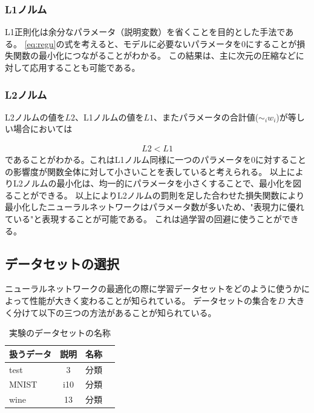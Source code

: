 \subsubsection{L1ノルム}
L1正則化は余分なパラメータ（説明変数）を省くことを目的とした手法である。
\ref{eq:regu}の式を考えると、モデルに必要ないパラメータを$ 0 $にすることが損失関数の最小化につながることがわかる。
この結果は、主に次元の圧縮などに対して応用することも可能である。

\subsubsection{L2ノルム}
L2ノルムの値を$ L2 $、L1ノルムの値を$ L1 $、またパラメータの合計値($ \sim_i w_i $)が等しい場合においては

\begin{eqnarray}
L2 < L1
\label{eq:norm uneq}
\end{eqnarray}
であることがわかる。これはL1ノルム同様に一つのパラメータを$ 0 $に対することの影響度が関数全体に対して小さいことを表していると考えられる。
以上によりL2ノルムの最小化は、均一的にパラメータを小さくすることで、最小化を図ることができる。
以上によりL2ノルムの罰則を足した合わせた損失関数により最小化したニューラルネットワークはパラメータ数が多いため、"表現力に優れている"と表現することが可能である。
これは過学習の回避に使うことができる。


\subsection{データセットの選択}
ニューラルネットワークの最適化の際に学習データセットをどのように使うかによって性能が大きく変わることが知られている。
データセットの集合を$ D $ 大きく分けて以下の三つの方法があることが知られている。

\begin{table}[htbp]
    \begin{center}
        \caption{実験のデータセットの名称}
        \begin{tabular}{l*{2}{c}r}
        扱うデータ      & 説明 & 名称 \\
        \hline
        test           & 3  & 分類 \\
        MNIST               & i10 & 分類  \\
        wine        & 13 & 分類 \\
        \end{tabular}
    \end{center}
\end{table}




